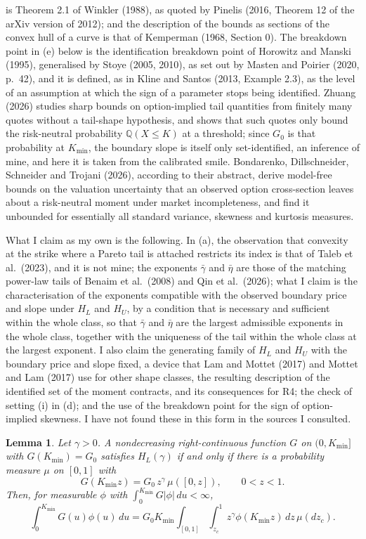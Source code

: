 \documentclass[11pt]{article}
\newtheorem{lemma}[proposition]{Lemma}
\theoremstyle{remark}
\newcommand{\Q}{\mathbb{Q}}
\begin{document}
is Theorem 2.1 of Winkler (1988), as quoted by Pinelis (2016, Theorem 12 of the arXiv version of 2012); and the description of the bounds as sections of the convex hull of a curve is that of Kemperman (1968, Section 0). The breakdown point in (e) below is the identification breakdown point of Horowitz and Manski (1995), generalised by Stoye (2005, 2010), as set out by Masten and Poirier (2020, p.~42), and it is defined, as in Kline and Santos (2013, Example 2.3), as the level of an assumption at which the sign of a parameter stops being identified. Zhuang (2026) studies sharp bounds on option-implied tail quantities from finitely many quotes without a tail-shape hypothesis, and shows that such quotes only bound the risk-neutral probability $\Q(X\le K)$ at a threshold; since $G_0$ is that probability at $K_{\min}$, the boundary slope is itself only set-identified, an inference of mine, and here it is taken from the calibrated smile. Bondarenko, Dillschneider, Schneider and Trojani (2026), according to their abstract, derive model-free bounds on the valuation uncertainty that an observed option cross-section leaves about a risk-neutral moment under market incompleteness, and find it unbounded for essentially all standard variance, skewness and kurtosis measures.

What I claim as my own is the following. In (a), the observation that convexity at the strike where a Pareto tail is attached restricts its index is that of Taleb et al.\ (2023), and it is not mine; the exponents $\bar\gamma$ and $\bar\eta$ are those of the matching power-law tails of Benaim et al.\ (2008) and Qin et al.\ (2026); what I claim is the characterisation of the exponents compatible with the observed boundary price and slope under $H_L$ and $H_U$, by a condition that is necessary and sufficient within the whole class, so that $\bar\gamma$ and $\bar\eta$ are the largest admissible exponents in the whole class, together with the uniqueness of the tail within the whole class at the largest exponent. I also claim the generating family of $H_L$ and $H_U$ with the boundary price and slope fixed, a device that Lam and Mottet (2017) and Mottet and Lam (2017) use for other shape classes, the resulting description of the identified set of the moment contracts, and its consequences for R4; the check of setting (i) in (d); and the use of the breakdown point for the sign of option-implied skewness. I have not found these in this form in the sources I consulted.

\begin{lemma}
Let $\gamma>0$. A nondecreasing right-continuous function $G$ on $(0,K_{\min}]$ with $G(K_{\min})=G_0$ satisfies $H_L(\gamma)$ if and only if there is a probability measure $\mu$ on $[0,1]$ with
\[
G(K_{\min}z)=G_0\,z^\gamma\,\mu([0,z]),\qquad 0<z<1.
\]
Then, for measurable $\phi$ with $\int_0^{K_{\min}}G|\phi|\,du<\infty$,
\[
\int_0^{K_{\min}}G(u)\phi(u)\,du=G_0K_{\min}\int_{[0,1]}\int_{z_c}^1z^\gamma\phi(K_{\min}z)\,dz\,\mu(dz_c).
\]
\end{lemma}
\end{document}
